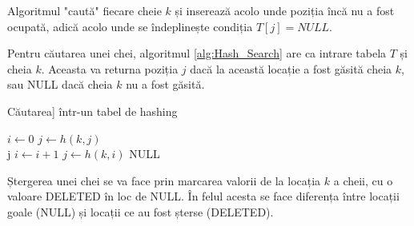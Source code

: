 Algoritmul "caută" fiecare cheie $k$ și inserează acolo unde poziția încă nu a fost ocupată, adică acolo unde se îndeplinește condiția $T[j]=NULL$.


Pentru căutarea unei chei, algoritmul \ref{alg:Hash_Search} are ca intrare tabela $T$ și cheia $k$. Aceasta va returna poziția $j$ dacă la această locație a fost găsită cheia $k$, sau NULL dacă cheia $k$ nu a fost găsită.
 

\begin{algorithm} [H]
	\caption{Căutarea] într-un tabel de hashing}\label{alg:Hash_Search}
	\begin{algorithmic}[1]
		\State $i \gets 0$		
		\State $j \gets h(k,j)$	
		\\
		\Return j
		\EndIf
		\State $i \gets i+1$
		\State $j \gets h(k,i)$			
		\EndWhile
		\Return NULL
		\EndProcedure
	\end{algorithmic}
\end{algorithm}

Ștergerea unei chei se va face prin marcarea valorii de la locația $k$ a cheii, cu o valoare DELETED în loc de NULL. În felul acesta se face diferența între locații goale (NULL) și locații ce au fost șterse (DELETED).

